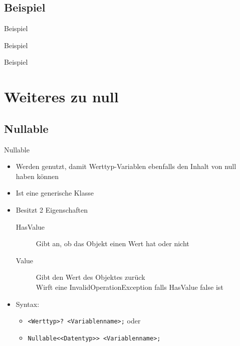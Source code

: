 \subsection{Beispiel}
\begin{frame}{Beispiel}
	
\end{frame}

\begin{frame}{Beispiel}
	
\end{frame}

\begin{frame}{Beispiel}
	
\end{frame}

\section{Weiteres zu null}
\subsection{Nullable}
\begin{frame}{Nullable}
	\begin{itemize}
		\item Werden genutzt, damit Werttyp-Variablen ebenfalls den Inhalt von \alert{null} haben können
		\item Ist eine generische Klasse
		\item Besitzt 2 Eigenschaften
		\begin{description}
			\item[HasValue] Gibt an, ob das Objekt einen Wert hat oder nicht
			\item[Value] Gibt den Wert des Objektes zurück\\ Wirft eine InvalidOperationException falls HasValue \alert{false} ist 
		\end{description}
		\item Syntax:
		\begin{itemize}
			\item \texttt{\alert{<Werttyp>}? \alert{<Variablenname>};} oder
			\item \texttt{Nullable<\alert{<Datentyp>}> \alert{<Variablenname>};}
		\end{itemize}
	\end{itemize}
\end{frame}

